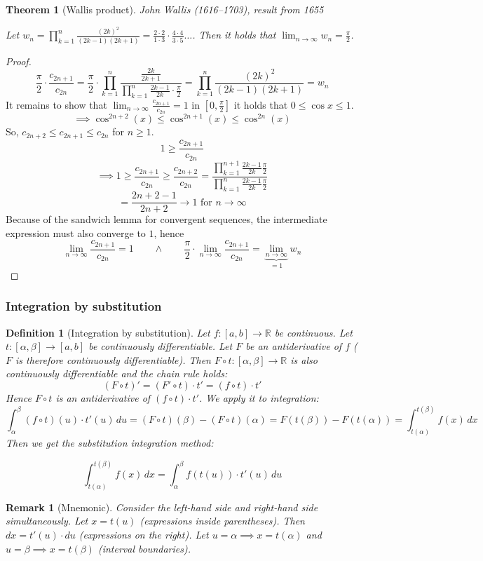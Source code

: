 \documentclass{article}
\newtheorem{theorem}{Theorem}  \numberwithin{theorem}{section}
\newtheorem{definition}{Definition}  \numberwithin{definition}{section}
\newtheorem{remark}{Remark}  \numberwithin{remark}{section}
\begin{document}
\begin{theorem}[Wallis product]
  John Wallis (1616--1703), result from 1655

  Let $w_n = \prod_{k=1}^n \frac{(2k)^2}{(2k - 1)(2k + 1)} = \frac{2\cdot 2}{1 \cdot 3} \cdot \frac{4 \cdot 4}{3 \cdot 5} \ldots$.
  Then it holds that $\lim_{n\to\infty} w_n = \frac\pi2$.
\end{theorem}
\begin{proof}
  \[
    \frac\pi2 \cdot \frac{c_{2n+1}}{c_{2n}}
    = \frac\pi2 \cdot \prod_{k=1}^n \frac{\frac{2k}{2k+1}}{\prod_{k=1}^n \frac{2k-1}{2k} \cdot \frac\pi2}
    = \prod_{k=1}^n \frac{(2k)^2}{(2k-1)(2k+1)} = w_n
  \]
  It remains to show that $\lim_{n\to\infty} \frac{c_{2n+1}}{c_{2n}} = 1$ in $[0, \frac\pi2]$ it holds that $0 \leq \cos{x} \leq 1$.
  \[ \implies \cos^{2n+2}(x) \leq \cos^{2n+1}(x) \leq \cos^{2n}(x) \]
  So, $c_{2n+2} \leq c_{2n+1} \leq c_{2n}$ for $n \geq 1$.
  \[ 1 \geq \frac{c_{2n+1}}{c_{2n}} \]
  \[ \implies 1 \geq \frac{c_{2n+1}}{c_{2n}} \geq \frac{c_{2n+2}}{c_{2n}} = \frac{\prod_{k=1}^{n+1} \frac{2k-1}{2k} \frac\pi2}{\prod_{k=1}^n \frac{2k-1}{2k} \frac\pi2} \]
  \[ = \frac{2n + 2 - 1}{2n + 2} \to 1  \text{ for } n \to \infty \]
  Because of the sandwich lemma for convergent sequences, the intermediate expression must also converge to $1$, hence
  \[ \lim_{n\to\infty} \frac{c_{2n+1}}{c_{2n}} = 1 \qquad \land \qquad \frac\pi2 \cdot \lim_{n\to\infty} \frac{c_{2n+1}}{c_{2n}} = \underbrace{\lim_{n\to\infty}}_{=1} w_n \]
\end{proof}

\subsubsection{Integration by substitution}
\begin{definition}[Integration by substitution]
  Let $f: [a,b] \to \mathbb R$ be continuous.
  Let $t: [\alpha,\beta] \to [a,b]$ be continuously differentiable.
  Let $F$ be an antiderivative of $f$ ($F$ is therefore continuously differentiable).
  Then $F \circ t: [\alpha, \beta] \to \mathbb R$ is also continuously differentiable and the chain rule holds:
  \[ (F \circ t)' = (F' \circ t) \cdot t' = (f \circ t) \cdot t' \]
  Hence $F \circ t$ is an antiderivative of $(f \circ t) \cdot t'$. We apply it to integration:
  \[
    \int_{\alpha}^\beta (f \circ t)(u) \cdot t'(u) \, du
    = (F \circ t)(\beta) - (F \circ t)(\alpha)
    = F(t(\beta)) - F(t(\alpha)) = \int_{t(\alpha)}^{t(\beta)} f(x) \, dx
  \]
  Then we get the substitution integration method:
  \begin{framed}
  \[
    \int_{t(\alpha)}^{t(\beta)} f(x) \, dx = \int_{\alpha}^\beta f(t(u)) \cdot t'(u) \, du
  \]
  \end{framed}
\end{definition}
\begin{remark}[Mnemonic]
  Consider the left-hand side and right-hand side simultaneously.
  Let $x = t(u)$ (expressions inside parentheses). Then $dx = t'(u) \cdot du$ (expressions on the right).
  Let $u = \alpha \implies x = t(\alpha)$ and $u = \beta \implies x = t(\beta)$ (interval boundaries).
\end{remark}
\end{document}
